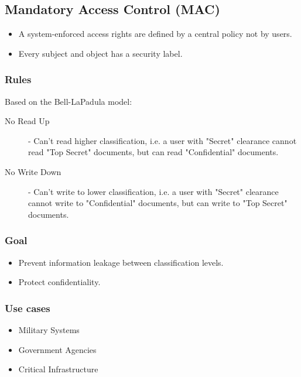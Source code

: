 \documentclass[12pt letter]{report}
\begin{document}
\subsection{Mandatory Access Control (MAC)}


\begin{itemize}
  \item A system-enforced access rights are defined by a central
    policy not by users.
  \item Every subject and object has a security label.
\end{itemize}

\subsubsection{Rules}
Based on the Bell-LaPadula model:
\begin{description}
  \item[No Read Up] - Can't read higher classification, i.e. a user
    with "Secret" clearance cannot read "Top Secret" documents, but
    can read "Confidential" documents.
  \item[No Write Down] - Can't write to lower classification, i.e. a
    user with "Secret" clearance cannot write to "Confidential"
    documents, but can write to "Top Secret" documents.
\end{description}

\subsubsection{Goal}
\begin{itemize}
  \item Prevent information leakage between classification levels.
  \item  Protect confidentiality.
\end{itemize}

\subsubsection{Use cases}
\begin{itemize}
  \item Military Systems
  \item Government Agencies
  \item Critical Infrastructure
\end{itemize}
\end{document}
